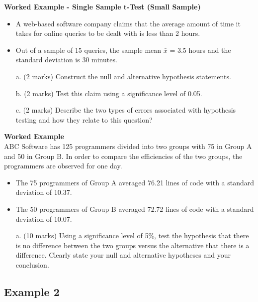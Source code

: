 \item \textbf{Worked Example  - Single Sample t-Test (Small Sample)  } \\ %
\begin{itemize}
\item A web-based software company claims that the average amount of time it takes for
online queries to be dealt with is less than 2 hours. 
\item Out of a sample of 15 queries, the
sample mean $\bar{x}$ = 3.5 hours and the standard deviation is 30 minutes.
\end{itemize}

\begin{itemize}
\item[a.](2 marks) Construct the null and alternative hypothesis statements.
\item[b.](2 marks) Test this claim using a significance level of 0.05.
\item[c.](2 marks) Describe the two types of errors associated with hypothesis testing and how
they relate to this question?
\end{itemize}

\item \textbf{Worked Example} \\ ABC Software has 125 programmers divided into two groups with 75 in
Group A and 50 in Group B. In order to compare the efficiencies of the
two groups, the programmers are observed for one day. \begin{itemize} \item The 75
programmers of Group A averaged 76.21 lines of code with a standard
deviation of 10.37. \item The 50 programmers of Group B averaged 72.72
lines of code with a standard deviation of 10.07. \end{itemize}
\begin{itemize}
\item[a.](10 marks) Using a significance
level of 5\%, test the hypothesis that there is no difference between the
two groups versus the alternative that there is a difference. Clearly state
your null and alternative hypotheses and your conclusion.
\end{itemize}



\subsection{Example 2}

